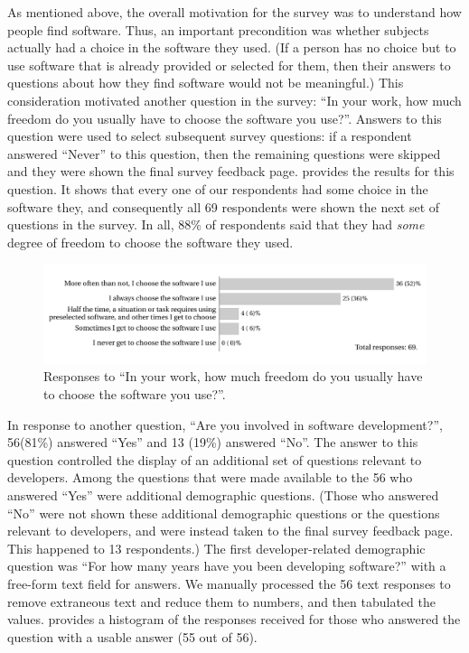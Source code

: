 \documentclass{casicswhitepaper}
\newcommand{\totalrespondents}{69\xspace}
\newcommand{\totaldevelopers}{56\xspace}
\begin{document}
As mentioned above, the overall motivation for the survey was to understand how people find software.  Thus, an important precondition was whether subjects actually had a choice in the software they used.  (If a person has no choice but to use software that is already provided or selected for them, then their answers to questions about how they find software would not be meaningful.)  This consideration motivated another question in the survey: ``In your work, how much freedom do you usually have to choose the software you use?''.   Answers to this question were used to select subsequent survey questions: if a respondent answered ``Never'' to this question, then the remaining questions were skipped and they were shown the final survey feedback page.   provides the results for this question.  It shows that every one of our respondents had some choice in the software they, and consequently all \totalrespondents respondents were shown the next set of questions in the survey.  In all, 88\% of respondents said that they had \emph{some} degree of freedom to choose the software they used.

\begin{figure}[htb]
  \vspace*{-1ex}
  \centering
  \includegraphics[width=6in]{files/plots/how-often-choose-software.pdf}
  \vspace*{-7ex}
  \caption{Responses to ``In your work, how much freedom do you usually have to choose the software you use?''.}
  \label{freedom}
\end{figure}

In response to another question, ``Are you involved in software development?'', \totaldevelopers (81\%) answered ``Yes'' and 13 (19\%) answered ``No''.  The answer to this question controlled the display of an additional set of questions relevant to developers.  Among the questions that were made available to the \totaldevelopers who answered ``Yes'' were additional demographic questions.  (Those who answered ``No'' were not shown these additional demographic questions or the questions relevant to developers, and were instead taken to the final survey feedback page.  This happened to 13 respondents.)  The first developer-related demographic question was ``For how many years have you been developing software?'' with a free-form text field for answers.  We manually processed the \totaldevelopers text responses to remove extraneous text and reduce them to numbers, and then tabulated the values.   provides a histogram of the responses received for those who answered the question with a usable answer (55 out of \totaldevelopers).
\end{document}
